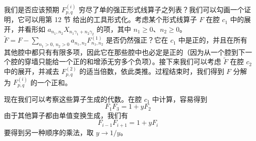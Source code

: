 我们是否应该预期 $F^{(i)}_{p,q}$ 穷尽了单的强正形式线算子之列表？我们可以勾画一个证明，它可以用第 12 节%
给出的工具形式化。考虑某个形式线算子 $F$ 在腔 $c_1$ 中的展开，并看形如 $a_{n_1,n_2}X_{n_1\gamma_1+n_2\gamma_2}$ 的项，其中 $n_1\geq 0$、$n_2\geq 0$。$\tilde F = F - \sum_{n_1>0,\,n_2>0} a_{n_1,n_2}F^{(1)}_{n_1,n_2}$ 是否仍然强正？它在 $c_1$ 中是正的，并且在所有其他腔中都只有有限多项，因此它在那些腔中也必定是正的（因为从一个腔到下一个腔的穿墙只能给一个正的和增添无穷多个负项）。接下来我们可以考虑 $\tilde F$ 在腔 $c_2$ 中的展开，并减去 $F^{(2)}_{p,q}$ 的适当倍数，依此类推。过程结束时，我们得到 $F$ 分解为 $F^{(i)}_{p,q}$ 的一个正和。

现在我们可以考察这些算子生成的代数。在腔 $c_1$ 中计算，容易得到
\begin{equation}
F_1 F_3 = 1 + y F_2
\end{equation}
由于其他算子都由单值变换生成，我们有
\begin{equation}\label{eq:Deformd-N3-rels}
F_{i-1} F_{i+1} = 1 + y F_i
\end{equation}
要得到另一种顺序的乘法，取 $y\to 1/y$。
